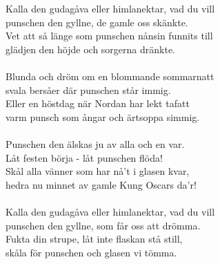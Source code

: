 {\footnotesize{}}\\
\\
Kalla den gudagåva eller himlanektar, vad du vill\\
punschen den gyllne, de gamle oss skänkte.\\
Vet att så länge som punschen nånsin funnits till\\
glädjen den höjde och sorgerna dränkte.\\
\\
Blunda och dröm om en blommande sommarnatt\\
svala bersåer där punschen står immig.\\
Eller en höstdag när Nordan har lekt tafatt\\
varm punsch som ångar och ärtsoppa simmig.\\
\\
Punschen den älskas ju av alla och en var.\\
Låt festen börja - låt punschen flöda!\\
Skål alla vänner som har nå’t i glasen kvar,\\
hedra nu minnet av gamle Kung Oscars da'r!\\
\\
Kalla den gudagåva eller himlanektar, vad du vill\\
punschen den gyllne, som får oss att drömma.\\
Fukta din strupe, låt inte flaskan stå still,\\
skåla för punschen och glasen vi tömma.
